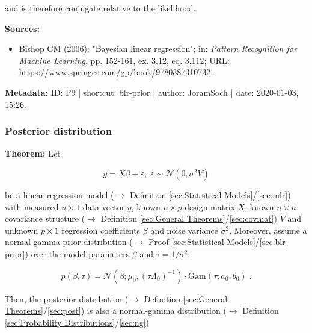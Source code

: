 \documentclass[a4paper,12pt,twoside]{book}
\begin{document}
and is therefore conjugate relative to the likelihood.


\vspace{1em}
\textbf{Sources:}
\begin{itemize}
\item Bishop CM (2006): "Bayesian linear regression"; in: \textit{Pattern Recognition for Machine Learning}, pp. 152-161, ex. 3.12, eq. 3.112; URL: \url{https://www.springer.com/gp/book/9780387310732}.
\end{itemize}


\vspace{1em}
\textbf{Metadata:} ID: P9 | shortcut: blr-prior | author: JoramSoch | date: 2020-01-03, 15:26.
\vspace{1em}



\subsubsection[\textbf{Posterior distribution}]{Posterior distribution} \label{sec:blr-post}
\setcounter{equation}{0}

\textbf{Theorem:} Let

\begin{equation} \label{eq:blr-post-GLM}
y = X \beta + \varepsilon, \; \varepsilon \sim \mathcal{N}(0, \sigma^2 V)
\end{equation}

be a linear regression model ($\rightarrow$ Definition \ref{sec:Statistical Models}/\ref{sec:mlr}) with measured $n \times 1$ data vector $y$, known $n \times p$ design matrix $X$, known $n \times n$ covariance structure ($\rightarrow$ Definition \ref{sec:General Theorems}/\ref{sec:covmat}) $V$ and unknown $p \times 1$ regression coefficients $\beta$ and noise variance $\sigma^2$.  Moreover, assume a normal-gamma prior distribution ($\rightarrow$ Proof \ref{sec:Statistical Models}/\ref{sec:blr-prior}) over the model parameters $\beta$ and $\tau = 1/\sigma^2$:

\begin{equation} \label{eq:blr-post-GLM-NG-prior}
p(\beta,\tau) = \mathcal{N}(\beta; \mu_0, (\tau \Lambda_0)^{-1}) \cdot \mathrm{Gam}(\tau; a_0, b_0) \; .
\end{equation}

Then, the posterior distribution ($\rightarrow$ Definition \ref{sec:General Theorems}/\ref{sec:post}) is also a normal-gamma distribution ($\rightarrow$ Definition \ref{sec:Probability Distributions}/\ref{sec:ng})
\end{document}

